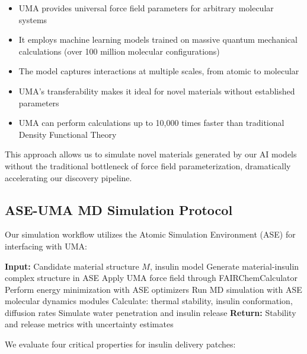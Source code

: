 \documentclass[11pt,a4paper]{article}
\begin{document}
\begin{itemize}
    \item UMA provides universal force field parameters for arbitrary molecular systems
    \item It employs machine learning models trained on massive quantum mechanical calculations (over 100 million molecular configurations)
    \item The model captures interactions at multiple scales, from atomic to molecular
    \item UMA's transferability makes it ideal for novel materials without established parameters
    \item UMA can perform calculations up to 10,000 times faster than traditional Density Functional Theory
\end{itemize}

This approach allows us to simulate novel materials generated by our AI models without the traditional bottleneck of force field parameterization, dramatically accelerating our discovery pipeline.

\subsection{ASE-UMA MD Simulation Protocol}

Our simulation workflow utilizes the Atomic Simulation Environment (ASE) for interfacing with UMA:

\begin{algorithm}
\caption{Insulin-Material MD Evaluation Pipeline with ASE-UMA}
\begin{algorithmic}[1]
\State \textbf{Input:} Candidate material structure $M$, insulin model
\State Generate material-insulin complex structure in ASE
\State Apply UMA force field through FAIRChemCalculator
\State Perform energy minimization with ASE optimizers
\State Run MD simulation with ASE molecular dynamics modules
\State Calculate: thermal stability, insulin conformation, diffusion rates
\State Simulate water penetration and insulin release
\State \textbf{Return:} Stability and release metrics with uncertainty estimates
\end{algorithmic}
\end{algorithm}

We evaluate four critical properties for insulin delivery patches:
\end{document}
